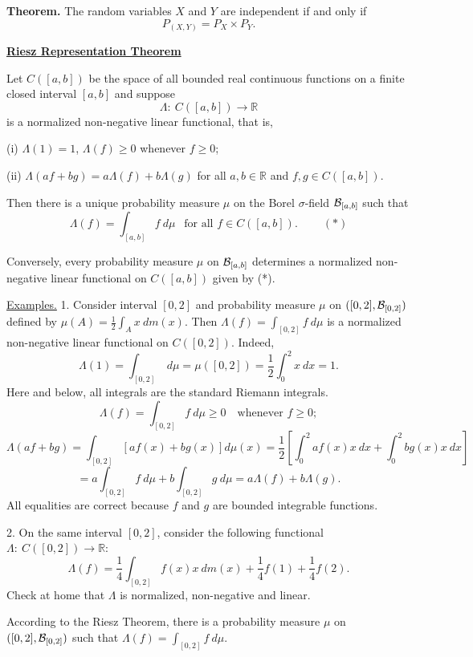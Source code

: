 \documentclass[a4paper,10pt]{article}
\def\RR{\mathbb{R}}
\newcommand{\1}[1]{\mathbf{1}_{\{#1\}}}
\begin{document}
{\bf Theorem.} The random variables $X$ and $Y$ are independent if and only if
  $$P_{(X,Y)}=P_X\times P_Y.$$
\vspace{3mm}

\begin{center}\bf\underline{Riesz Representation Theorem} \end{center}\vspace{3mm}

Let $C([a,b])$ be the space of all bounded real continuous functions on a finite closed interval $[a,b]$ and suppose
  $$\Lambda:~C([a,b])\to\RR$$
is a normalized non-negative linear functional, that is,

(i) $\Lambda(1)=1$, $\Lambda(f)\ge 0$ whenever $f\ge 0$;

(ii) $\Lambda(af+bg)=a\Lambda(f)+b\Lambda(g)$ for all $a,b\in\RR$ and $f,g\in C([a,b])$. \vspace{3mm}

Then there is a unique probability measure $\mu$ on the Borel $\sigma$-field ${\cal B}_{[a,b]}$ such that
  $$\Lambda(f)=\int_{[a,b]} f~d\mu~~\mbox{ for all } f\in C([a,b]).~~~~~~~~~~(*)$$

Conversely, every probability measure $\mu$ on ${\cal B}_{[a,b]}$ determines a normalized non-negative linear functional on $C([a,b])$ given by (*). \vspace{3mm}

\underline{Examples.} 1. Consider interval $[0,2]$ and probability measure $\mu$ on $([0,2],{\cal B}_{[0,2]})$ defined by $\mu(A)=\frac{1}{2}\int_A x~dm(x)$. Then $\Lambda(f)=\int_{[0,2]} f~d\mu$ is a normalized non-negative linear functional on $C([0,2])$. Indeed,
  $$\Lambda(1)=\int_{[0,2]} ~d\mu=\mu([0,2])=\frac{1}{2}\int_0^2 x~dx=1.$$
Here and below, all integrals are the standard Riemann integrals.
  $$\Lambda(f)=\int_{[0,2]} f~d\mu\ge 0 ~~~\mbox{ whenever } f\ge 0;$$
  $$\Lambda(af+bg)=\int_{[0,2]}[af(x)+bg(x)]d\mu(x)=\frac{1}{2}\left[\int_0^2 af(x)x~dx+\int_0^2 bg(x)x~dx\right]$$
  $$=a\int_{[0,2]} f~d\mu+b\int_{[0,2]} g~d\mu=a\Lambda(f)+b\Lambda(g).$$
All equalities are correct because $f$ and $g$ are bounded integrable functions.

2. On the same interval $[0,2]$, consider the following functional $\Lambda:~C([0,2])\to\RR$:
  $$\Lambda(f)=\frac{1}{4}\int_{[0,2]} f(x)x~dm(x)+\frac{1}{4} f(1)+\frac{1}{4} f(2).$$
Check at home that $\Lambda$ is normalized, non-negative and linear.

According to the Riesz Theorem, there is a probability measure $\mu$ on $([0,2],{\cal B}_{[0,2]})$ such that $\Lambda(f)=\int_{[0,2]} f~d\mu$.
\end{document}
